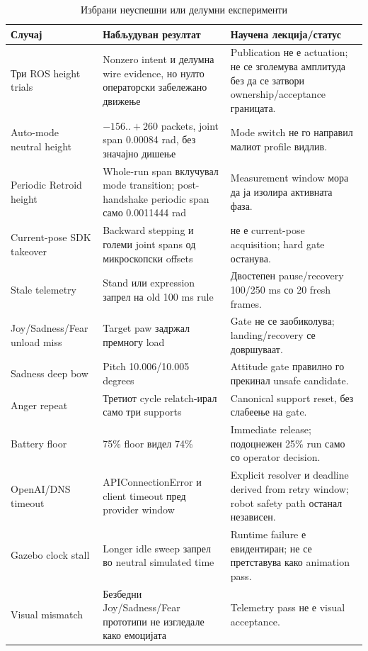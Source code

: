 \begin{table}[htbp]
\centering
\caption{Избрани неуспешни или делумни експерименти}
\label{tab:failures}
\small
\begin{tabularx}{\textwidth}{L{0.22\textwidth}YY}
\toprule
\textbf{Случај} & \textbf{Набљудуван резултат} & \textbf{Научена лекција/статус} \\
\midrule
Три ROS height trials & Nonzero intent и делумна wire evidence, но нулто операторски забележано движење & Publication не е actuation; не се зголемува амплитуда без да се затвори ownership/acceptance границата. \\
Auto-mode neutral height & $-156..+260$ packets, joint span 0.00084 rad, без значајно дишење & Mode switch не го направил малиот profile видлив. \\
Periodic Retroid height & Whole-run span вклучувал mode transition; post-handshake periodic span само 0.0011444 rad & Measurement window мора да ја изолира активната фаза. \\
Current-pose SDK takeover & Backward stepping и големи joint spans од микроскопски offsets &  не е current-pose acquisition; hard gate останува. \\
Stale telemetry & Stand или expression запрел на old 100 ms rule & Двостепен pause/recovery 100/250 ms со 20 fresh frames. \\
Joy/Sadness/Fear unload miss & Target paw задржал премногу load & Gate не се заобиколува; landing/recovery се довршуваат. \\
Sadness deep bow & Pitch 10.006/10.005 degrees & Attitude gate правилно го прекинал unsafe candidate. \\
Anger repeat & Третиот cycle relatch-ирал само три supports & Canonical support reset, без слабеење на gate. \\
Battery floor & 75\% floor видел 74\% & Immediate release; подоцнежен 25\% run само со operator decision. \\
OpenAI/DNS timeout & APIConnectionError и client timeout пред provider window & Explicit resolver и deadline derived from retry window; robot safety path останал независен. \\
Gazebo clock stall & Longer idle sweep запрел во neutral simulated time & Runtime failure е евидентиран; не се претставува како animation pass. \\
Visual mismatch & Безбедни Joy/Sadness/Fear прототипи не изгледале како емоцијата & Telemetry pass не е visual acceptance. \\
\bottomrule
\end{tabularx}
\end{table}
